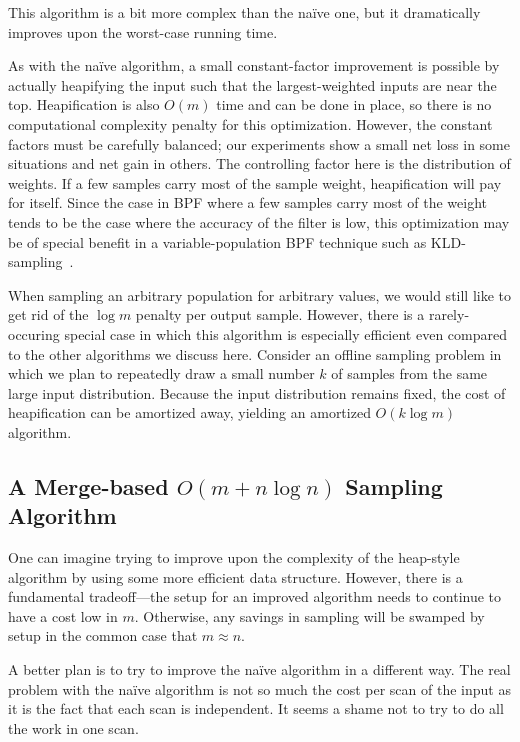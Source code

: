 \documentclass[12pt]{article}
\begin{document}
  This algorithm is a bit more complex than the na\"ive one,
  but it dramatically improves upon the worst-case running
  time.

  As with the na\"ive algorithm, a small constant-factor
  improvement is possible by actually heapifying the input
  such that the largest-weighted inputs are near the top.
  Heapification is also $O(m)$ time and can be done in
  place, so there is no computational complexity penalty for
  this optimization.  However, the constant factors must be
  carefully balanced; our experiments show a small net loss
  in some situations and net gain in others.  The
  controlling factor here is the distribution of weights. If
  a few samples carry most of the sample weight,
  heapification will pay for itself.  Since the case in BPF where a
  few samples carry most of the weight tends to be the case where the
  accuracy of the filter is low, this optimization may be of
  special benefit in a variable-population BPF technique
  such as KLD-sampling~\cite{kld}.

  When sampling an arbitrary population for arbitrary
  values, we would still like to get rid of the $\log m$
  penalty per output sample.  However, there is a
  rarely-occuring special case in which this algorithm is
  especially efficient even compared to the other algorithms
  we discuss here.  Consider an offline sampling problem in
  which we plan to repeatedly draw a small number $k$ of
  samples from the same large input distribution.  Because
  the input distribution remains fixed, the cost of
  heapification can be amortized away, yielding an amortized
  $O(k \log m)$ algorithm.

\subsection{A Merge-based $O(m + n \log n)$ Sampling Algorithm}\label{sec-merge}

  One can imagine trying to improve upon the complexity of
  the heap-style algorithm by using some more efficient data
  structure.  However, there is a fundamental tradeoff---the
  setup for an improved algorithm needs to continue to have
  a cost low in $m$.  Otherwise, any savings in sampling
  will be swamped by setup in the common case that $m
  \approx n$.

  A better plan is to try to improve the na\"ive algorithm
  in a different way.  The real problem with the na\"ive
  algorithm is not so much the cost per scan of the input as it is the
  fact that each scan is independent.  It seems a shame not
  to try to do all the work in one scan.
\end{document}
